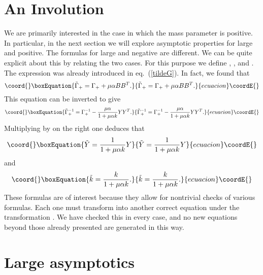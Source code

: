 \documentclass[a4paper,12pt]{article}
\begin{document}
\section{An Involution}

We are primarily interested in the case in which the mass
parameter \myHighlight{$\mu$}\coordHE{} is positive. In particular, in the next section we
will explore asymptotic properties for \myHighlight{$\mu$}\coordHE{} large and positive.
The formulas for \myHighlight{$\mu$}\coordHE{} large and negative are different. We can be
quite explicit about this by relating the two cases. For this
purpose we define \myHighlight{$\tilde\Gamma_+ = \Gamma_+(-\mu)$}\coordHE{}, \coordHE{}, and \coordHE{}. The expression
\myHighlight{$\tilde\Gamma_+$}\coordHE{} was already introduced in eq.~(\ref{tildeG}). In
fact, we found that
\begin{equation}\coord{}\boxEquation{
\tilde\Gamma_+ = \Gamma_+ + \mu \alpha BB^T.
}{
\tilde\Gamma_+ = \Gamma_+ + \mu \alpha BB^T.
}{ecuacion}\coordE{}\end{equation}
This equation can be inverted to give
\begin{equation}\coord{}\boxEquation{
\tilde\Gamma_+^{-1} = \Gamma_+^{-1} - {\mu \alpha \over 1 + \mu
\alpha k} YY^T.
}{
\tilde\Gamma_+^{-1} = \Gamma_+^{-1} - {\mu \alpha \over 1 + \mu
\alpha k} YY^T.
}{ecuacion}\coordE{}\end{equation}
Multiplying by \coordHE{} on the right one deduces that
\begin{equation}\coord{}\boxEquation{
\tilde Y = {1 \over 1 + \mu \alpha k} Y
}{
\tilde Y = {1 \over 1 + \mu \alpha k} Y
}{ecuacion}\coordE{}\end{equation}
and
\begin{equation}\coord{}\boxEquation{
\tilde k = {k \over 1 + \mu \alpha k} .
}{
\tilde k = {k \over 1 + \mu \alpha k} .
}{ecuacion}\coordE{}\end{equation}
These formulas are of interest because they allow for nontrivial
checks of various formulas. Each one must transform into another
correct equation under the transformation \myHighlight{$\mu \to - \mu$}\coordHE{}. We have
checked this in every case, and no new equations beyond those
already presented are generated in this way.

\section{Large \myHighlight{$\mu$}\coordHE{} asymptotics}
\end{document}
